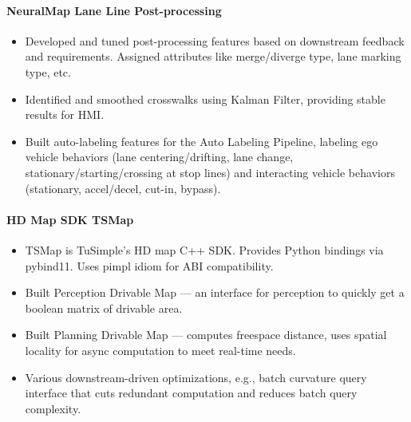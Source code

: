 \paragraph{NeuralMap Lane Line Post-processing}
\begin{itemize}
      \item Developed and tuned post-processing features based on downstream feedback and requirements.
            Assigned attributes like merge/diverge type, lane marking type, etc.
      \item Identified and smoothed crosswalks using Kalman Filter, providing stable results for HMI.
      \item Built auto-labeling features for the Auto Labeling Pipeline,
            labeling ego vehicle behaviors
            (lane centering/drifting, lane change, stationary/starting/crossing at stop lines)
            and interacting vehicle behaviors
            (stationary, accel/decel, cut-in, bypass).
\end{itemize}


\paragraph{HD Map SDK TSMap}
\begin{itemize}
      \item TSMap is TuSimple's HD map C++ SDK.
            Provides Python bindings via pybind11.
            Uses pimpl idiom for ABI compatibility.
      \item Built Perception Drivable Map ---
            an interface for perception to quickly get a boolean matrix of drivable area.
      \item Built Planning Drivable Map ---
            computes freespace distance, uses spatial locality for async computation to meet real-time needs.
      \item Various downstream-driven optimizations,
            e.g., batch curvature query interface that cuts redundant computation and reduces batch query complexity.
\end{itemize}

